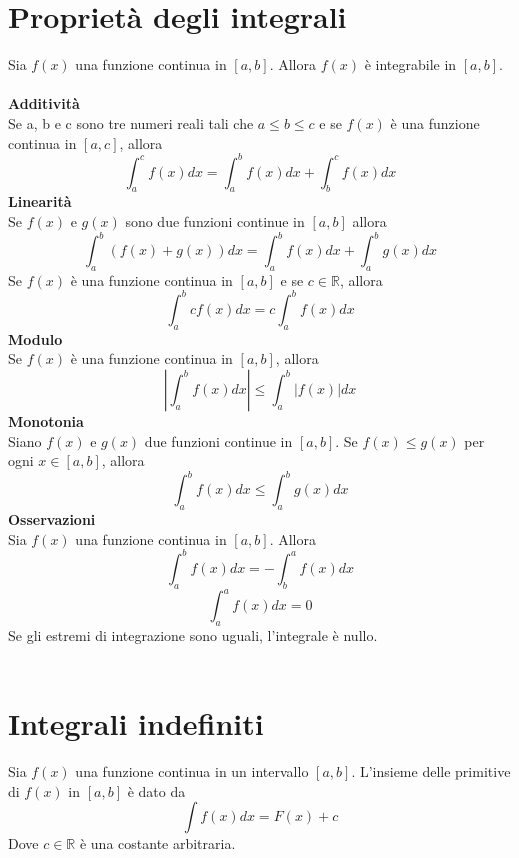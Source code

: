 \documentclass{article}
\begin{document}
\section*{Proprietà degli integrali}
Sia $f(x)$ una funzione continua in $[a,b]$. Allora $f(x)$ è integrabile in $[a,b]$.\\\\
\textbf{Additività}\\
Se a, b e c sono tre numeri reali tali che $a \leq b \leq c$ e se $f(x)$ è una funzione continua in $[a,c]$, allora
\begin{equation*}
    \int_a^c f(x)dx = \int_a^b f(x)dx + \int_b^c f(x)dx
\end{equation*}
\textbf{Linearità}\\
Se $f(x)$ e $g(x)$ sono due funzioni continue in $[a,b]$ allora
\begin{equation*}
    \int_a^b (f(x)+g(x))dx = \int_a^b f(x)dx + \int_a^b g(x)dx
\end{equation*}
Se $f(x)$ è una funzione continua in $[a,b]$ e se $c \in \mathbb{R}$, allora
\begin{equation*}
    \int_a^b cf(x)dx = c\int_a^b f(x)dx
\end{equation*}
\textbf{Modulo}\\
Se $f(x)$ è una funzione continua in $[a,b]$, allora
\begin{equation*}
    \left|\int_a^b f(x)dx\right| \leq \int_a^b |f(x)|dx
\end{equation*}
\textbf{Monotonia}\\
Siano $f(x)$ e $g(x)$ due funzioni continue in $[a,b]$. Se $f(x) \leq g(x)$ per ogni $x \in [a,b]$, allora
\begin{equation*}
    \int_a^b f(x)dx \leq \int_a^b g(x)dx
\end{equation*}
\textbf{Osservazioni}\\
Sia $f(x)$ una funzione continua in $[a,b]$. Allora
\begin{equation*}
    \int_a^b f(x)dx = -\int_b^a f(x)dx
\end{equation*}
\begin{equation*}
    \int_a^a f(x)dx = 0
\end{equation*}
Se gli estremi di integrazione sono uguali, l'integrale è nullo.\\\\
\section*{Integrali indefiniti}
Sia $f(x)$ una funzione continua in un intervallo $[a,b]$. L'insieme delle primitive di $f(x)$ in $[a,b]$ è dato da
\begin{equation*}
    \int f(x)dx=F(x)+c
\end{equation*}
Dove $c \in \mathbb{R}$ è una costante arbitraria.\\
\end{document}
